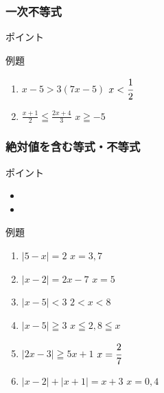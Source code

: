 \documentclass[10pt,dvipdfmx]{jsarticle}
\newcommand{\answer}[2]{{\color{orange}#2}}
\newcommand{\answer}[2]{\vspace{#1mm}}
\begin{document}
\subsubsection*{一次不等式}
\begin{itembox}[l]{ポイント}
  \vspace{8mm}

\end{itembox}
\begin{itembox}[l]{例題}
  \begin{large}
    \begin{enumerate}
      \item $x-5>3(7x-5)$ \answer{0}{$x<\cfrac{1}{2}$}
      \item $\frac{x+1}{2}\leqq\frac{2x+4}{3}$ \answer{0}{$x\geqq-5$}
    \end{enumerate}
  \end{large}
\end{itembox}

\subsubsection*{絶対値を含む等式・不等式}
\begin{itembox}[l]{ポイント}
  \begin{Large}
    \begin{itemize}
      \item \item
    \end{itemize}
  \end{Large}
\end{itembox}

\begin{itembox}[l]{例題}
  \begin{large}
    \begin{enumerate}
      \item $|5-x|=2$  \answer{0}{$x=3, 7$}
      \item $|x-2|=2x-7$  \answer{0}{$x=5$}
      \item $|x-5|<3$  \answer{0}{$2<x<8$}
      \item $|x-5|\geqq3$  \answer{0}{$x\leqq2, 8\leqq x$}
      \item $|2x-3|\geqq5x+1$  \answer{0}{$x=\cfrac{2}{7}$}
      \item $|x-2|+|x+1|=x+3$  \answer{0}{$x=0, 4$}
    \end{enumerate}
  \end{large}
\end{itembox}
\end{document}
